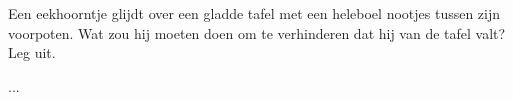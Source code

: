 
\begin{exercise}



Een eekhoorntje glijdt over een gladde tafel met een heleboel nootjes tussen zijn voorpoten. Wat zou hij moeten doen om te verhinderen dat hij van de tafel valt? Leg uit.

\begin{oplossing}
...
\end{oplossing}

\end{exercise}
